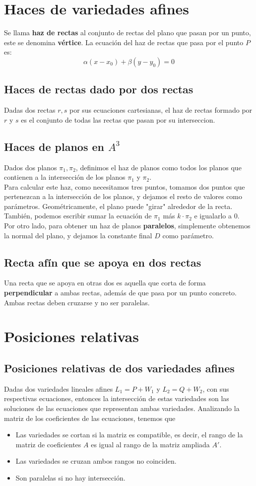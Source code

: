 \documentclass{./Geometria.tex}
\begin{document}
\section{Haces de variedades afines}
Se llama \textbf{haz de rectas} al conjunto de rectas del plano que pasan por un punto, este se denomina \textbf{vértice}. La ecuación del haz de rectas que pasa por el punto $P$ es:
\[
	\alpha(x-x_0)+\beta(y-y_0)=0
\]
\subsection{Haces de rectas dado por dos rectas}
Dadas dos rectas $r,s$ por sus ecuaciones cartesianas, el haz de rectas formado por $r$ y $s$ es el conjunto de todas las rectas que pasan por su interseccion.
\subsection{Haces de planos en $A^{3}$ }
Dados dos planos $\pi_1, \pi_2$, definimos el haz de planos como todos los planos que contienen a la intersección de los planos $\pi_1$ y $\pi_2$.\\
Para calcular este haz, como necesitamos tres puntos, tomamos dos puntos que pertenezcan a la intersección de los planos, y dejamos el resto de valores como parámetros. Geométricamente, el plano puede "girar" alrededor de la recta. También, podemos escribir sumar la ecuación de $\pi_1$ más $k\cdot \pi_2$ e igualarlo a $0$.\\
Por otro lado, para obtener un haz de planos \textbf{paralelos}, simplemente obtenemos la normal del plano, y dejamos la constante final $D$ como parámetro.
\subsection{Recta afín que se apoya en dos rectas}
Una recta que se apoya en otras dos es aquella que corta de forma \textbf{perpendicular} a ambas rectas, además de que pasa por un punto concreto. Ambas rectas deben cruzarse y no ser paralelas.
\section{Posiciones relativas}
\subsection{Posiciones relativas de dos variedades afines}
Dadas dos variedades lineales afines $L_1=P+W_1$ y $L_2=Q+W_2$, con sus respectivas ecuaciones, entonces la intersección de estas variedades son las soluciones de las ecuaciones que representan ambas variedades. Analizando la matriz de los coeficientes de las ecuaciones, tenemos que
\begin{itemize}
	\item Las variedades se cortan si la matriz es compatible, es decir, el rango de la matriz de coeficientes $A$ es igual al rango de la matriz ampliada $A'$.
	\item Las variedades se cruzan ambos rangos no coinciden.
	\item Son paralelas si no hay intersección.
\end{itemize}
\end{document}
